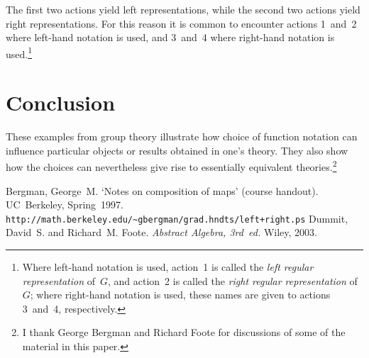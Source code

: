 \documentclass[letterpaper]{article}
\theoremstyle{definition}
\theoremstyle{plain}
\begin{document}
\bigskip
\noindent The first two actions yield left representations, while the second two actions yield right representations. For this reason it is common to encounter actions 1~and~2 where left-hand notation is used, and 3~and~4 where right-hand notation is used.\footnote{Where left-hand notation is used, action~1 is called the \emph{left regular representation} of~$G$, and action~2 is called the \emph{right regular representation} of~$G$; where right-hand notation is used, these names are given to actions 3~and~4, respectively.}

\section*{Conclusion}
These examples from group theory illustrate how choice of function notation can influence particular objects or results obtained in one's theory. They also show how the choices can nevertheless give rise to essentially equivalent theories.\footnote{I thank George Bergman and Richard Foote for discussions of some of the material in this paper.}

\begin{thebibliography}{0}
 Bergman, George~M. `Notes on composition of maps' (course handout). UC~Berkeley, Spring~1997.\\
\verb$http://math.berkeley.edu/~gbergman/grad.hndts/left+right.ps$
 Dummit, David~S. and Richard~M. Foote. \emph{Abstract Algebra, 3rd~ed.} Wiley, 2003.
\end{thebibliography}
\end{document}
